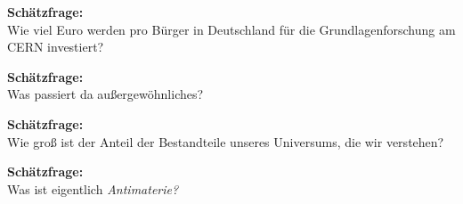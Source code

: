 \begin{frame} \Large
    \begin{center}
     \textcolor{LHCbDarkBlue}{\textbf{Schätzfrage:} }\\  \vspace{1cm}
     Wie viel Euro werden pro Bürger in Deutschland für die Grundlagenforschung am CERN investiert?
    \end{center} \pause
    \begin{center}  \vspace{1cm}
    \end{center}
\end{frame}

\begin{frame} \Large
    \begin{center}
     \textcolor{LHCbDarkBlue}{\textbf{Schätzfrage:} }\\  \vspace{1cm}
     Was passiert da außergewöhnliches?
    \end{center} \pause
    \begin{center}  \vspace{1cm}
    \end{center}
\end{frame}

\begin{frame} \Large
    \begin{center}
     \textcolor{LHCbDarkBlue}{\textbf{Schätzfrage:} }\\  \vspace{1cm}
     Wie groß ist der Anteil der Bestandteile unseres Universums, die wir verstehen?
    \end{center}\pause 
    \begin{center}  \vspace{1cm}
    \end{center}
\end{frame}

\begin{frame} \Large
    \begin{center}
     \textcolor{LHCbDarkBlue}{\textbf{Schätzfrage:} }\\  \vspace{1cm}
     Was ist eigentlich \emph{Antimaterie?}
    \end{center} \pause
    \begin{center}  \vspace{1cm}
    \end{center}
\end{frame}

